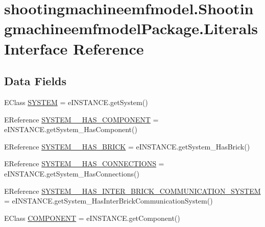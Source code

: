 \hypertarget{interfaceshootingmachineemfmodel_1_1_shootingmachineemfmodel_package_1_1_literals}{\section{shootingmachineemfmodel.\-Shootingmachineemfmodel\-Package.\-Literals Interface Reference}
\label{interfaceshootingmachineemfmodel_1_1_shootingmachineemfmodel_package_1_1_literals}
}
\subsection*{Data Fields}
\begin{DoxyCompactItemize}
\item 
E\-Class \hyperlink{interfaceshootingmachineemfmodel_1_1_shootingmachineemfmodel_package_1_1_literals_ac93bb8b04721a8beeb74dd13c23318d6}{S\-Y\-S\-T\-E\-M} = e\-I\-N\-S\-T\-A\-N\-C\-E.\-get\-System()
\item 
E\-Reference \hyperlink{interfaceshootingmachineemfmodel_1_1_shootingmachineemfmodel_package_1_1_literals_a8a5d19bff1b5c893c01dde5a1b5f58da}{S\-Y\-S\-T\-E\-M\-\_\-\-\_\-\-H\-A\-S\-\_\-\-C\-O\-M\-P\-O\-N\-E\-N\-T} = e\-I\-N\-S\-T\-A\-N\-C\-E.\-get\-System\-\_\-\-Has\-Component()
\item 
E\-Reference \hyperlink{interfaceshootingmachineemfmodel_1_1_shootingmachineemfmodel_package_1_1_literals_a304ec5872db835a04093f6d0223a4dcd}{S\-Y\-S\-T\-E\-M\-\_\-\-\_\-\-H\-A\-S\-\_\-\-B\-R\-I\-C\-K} = e\-I\-N\-S\-T\-A\-N\-C\-E.\-get\-System\-\_\-\-Has\-Brick()
\item 
E\-Reference \hyperlink{interfaceshootingmachineemfmodel_1_1_shootingmachineemfmodel_package_1_1_literals_af9e8b9885c42be220e22482ed80c1cb7}{S\-Y\-S\-T\-E\-M\-\_\-\-\_\-\-H\-A\-S\-\_\-\-C\-O\-N\-N\-E\-C\-T\-I\-O\-N\-S} = e\-I\-N\-S\-T\-A\-N\-C\-E.\-get\-System\-\_\-\-Has\-Connections()
\item 
E\-Reference \hyperlink{interfaceshootingmachineemfmodel_1_1_shootingmachineemfmodel_package_1_1_literals_a9c206475bba2cf56ce9bc06a84add058}{S\-Y\-S\-T\-E\-M\-\_\-\-\_\-\-H\-A\-S\-\_\-\-I\-N\-T\-E\-R\-\_\-\-B\-R\-I\-C\-K\-\_\-\-C\-O\-M\-M\-U\-N\-I\-C\-A\-T\-I\-O\-N\-\_\-\-S\-Y\-S\-T\-E\-M} = e\-I\-N\-S\-T\-A\-N\-C\-E.\-get\-System\-\_\-\-Has\-Inter\-Brick\-Communication\-System()
\item 
E\-Class \hyperlink{interfaceshootingmachineemfmodel_1_1_shootingmachineemfmodel_package_1_1_literals_af05b7cb28e9a2e08bd406d349281ba61}{C\-O\-M\-P\-O\-N\-E\-N\-T} = e\-I\-N\-S\-T\-A\-N\-C\-E.\-get\-Component()

\end{DoxyCompactItemize}
